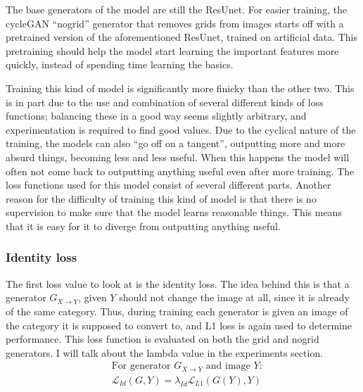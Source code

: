 The base generators of the model are still the ResUnet. For easier training, the cycleGAN ``nogrid'' generator that removes grids from images starts off with a pretrained version of the aforementioned ResUnet, trained on artificial data. This pretraining should help the model start learning the important features more quickly, instead of spending time learning the basics.

Training this kind of model is significantly more finicky than the other two. This is in part due to the use and combination of several different kinds of loss functions; balancing these in a good way seems slightly arbitrary, and experimentation is required to find good values. Due to the cyclical nature of the training, the models can also ``go off on a tangent'', outputting more and more absurd things, becoming less and less useful. When this happens the model will often not come back to outputting anything useful even after more training. The loss functions used for this model consist of several different parts. Another reason for the difficulty of training this kind of model is that there is no supervision to make sure that the model learns reasonable things. This means that it is easy for it to diverge from outputting anything useful.

\subsubsection{Identity loss}
The first loss value to look at is the identity loss. The idea behind this is that a generator $G_{X\rightarrow Y}$, given $Y$ should not change the image at all, since it is already of the same category. Thus, during training each generator is given an image of the category it is supposed to convert to, and L1 loss is again used to determine performance. This loss function is evaluated on both the grid and nogrid generators. I will talk about the lambda value in the experiments section.
\begin{align}
  &\text{For generator $G_{X\rightarrow Y}$ and image $Y$:} \nonumber\\
  &\mathcal{L}_{Id}(G,Y) = \lambda_{Id} \mathcal{L}_{L1}\left(G(Y),Y\right)\label{eq:idlambda}
\end{align}

